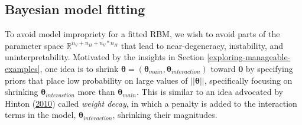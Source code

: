 \documentclass[]{article}
\theoremstyle{definition}
\newcommand{\nv}{{n_{\scriptscriptstyle V}}}
\newcommand{\nh}{{n_{\scriptscriptstyle H}}}
\begin{document}
\hypertarget{bayesian-model-fitting}{%
\subsection{Bayesian model fitting}\label{bayesian-model-fitting}}

To avoid model impropriety for a fitted RBM, we wish to avoid parts of
the parameter space \(\mathbb{R}^{\nv + \nh + \nv*\nh}\) that lead to
near-degeneracy, instability, and uninterpretability. Motivated by the
insights in Section \ref{exploring-manageable-examples}, one idea is to
shrink
\(\boldsymbol \theta = (\boldsymbol \theta_{main}, \boldsymbol \theta_{interaction})\)
toward \(\boldsymbol 0\) by specifying priors that place low probability
on large values of \(||\boldsymbol \theta||\), specifically focusing on
shrinking \(\boldsymbol \theta_{interaction}\) more than
\(\boldsymbol \theta_{main}\). This is similar to an idea advocated by
Hinton (\protect\hyperlink{ref-hinton2010practical}{2010}) called
\emph{weight decay}, in which a penalty is added to the interaction
terms in the model, \(\boldsymbol \theta_{interaction}\), shrinking
their magnitudes.
\end{document}

